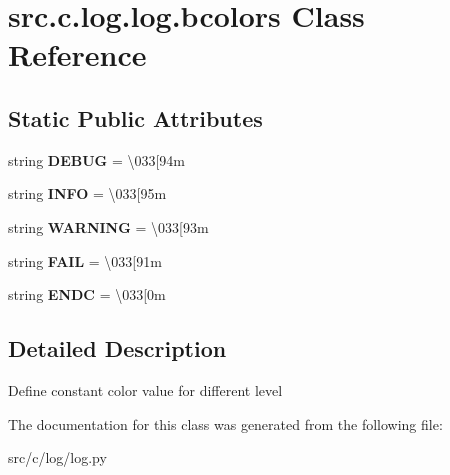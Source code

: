 \hypertarget{classsrc_1_1c_1_1log_1_1log_1_1bcolors}{}\section{src.\+c.\+log.\+log.\+bcolors Class Reference}
\label{classsrc_1_1c_1_1log_1_1log_1_1bcolors}
\subsection*{Static Public Attributes}
\begin{DoxyCompactItemize}
\item 
\hypertarget{classsrc_1_1c_1_1log_1_1log_1_1bcolors_ae17b440a4406c7c1ae48d03b8e785c1d}{}string {\bfseries D\+E\+B\+U\+G} = \textquotesingle{}\textbackslash{}033\mbox{[}94m \textquotesingle{}\label{classsrc_1_1c_1_1log_1_1log_1_1bcolors_ae17b440a4406c7c1ae48d03b8e785c1d}

\item 
\hypertarget{classsrc_1_1c_1_1log_1_1log_1_1bcolors_aa768b6bae021fdb90f9c7f763d54ca76}{}string {\bfseries I\+N\+F\+O} = \textquotesingle{} \textbackslash{}033\mbox{[}95m \textquotesingle{}\label{classsrc_1_1c_1_1log_1_1log_1_1bcolors_aa768b6bae021fdb90f9c7f763d54ca76}

\item 
\hypertarget{classsrc_1_1c_1_1log_1_1log_1_1bcolors_a2c92f994d030619d972d82145f515553}{}string {\bfseries W\+A\+R\+N\+I\+N\+G} = \textquotesingle{} \textbackslash{}033\mbox{[}93m \textquotesingle{}\label{classsrc_1_1c_1_1log_1_1log_1_1bcolors_a2c92f994d030619d972d82145f515553}

\item 
\hypertarget{classsrc_1_1c_1_1log_1_1log_1_1bcolors_aa6e028347915ccc4086d3357eb4fa8eb}{}string {\bfseries F\+A\+I\+L} = \textquotesingle{} \textbackslash{}033\mbox{[}91m \textquotesingle{}\label{classsrc_1_1c_1_1log_1_1log_1_1bcolors_aa6e028347915ccc4086d3357eb4fa8eb}

\item 
\hypertarget{classsrc_1_1c_1_1log_1_1log_1_1bcolors_a65cc3eee638a2a8ebbb2cb6f9b6f5d35}{}string {\bfseries E\+N\+D\+C} = \textquotesingle{} \textbackslash{}033\mbox{[}0m \textquotesingle{}\label{classsrc_1_1c_1_1log_1_1log_1_1bcolors_a65cc3eee638a2a8ebbb2cb6f9b6f5d35}

\end{DoxyCompactItemize}


\subsection{Detailed Description}
\begin{DoxyVerb}Define constant color value for different level
\end{DoxyVerb}
 

The documentation for this class was generated from the following file\+:\begin{DoxyCompactItemize}
\item 
src/c/log/log.\+py\end{DoxyCompactItemize}
